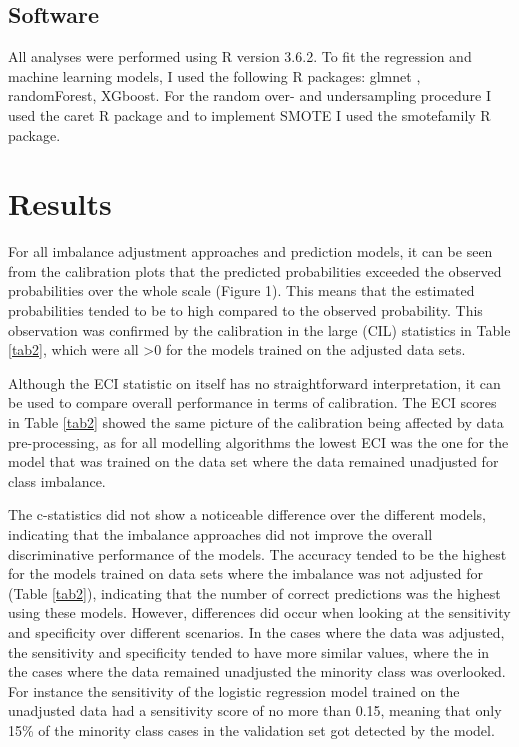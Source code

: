 \documentclass[AMA,STIX1COL, table]{WileyNJD-v2}
\begin{document}
\subsection{Software}
All analyses were performed using {\selectfont R version 3.6.2}.\cite{R} To fit the regression and machine learning models, I used the following R packages: {\selectfont
glmnet} \cite{glmnet}, 
{\selectfont randomForest}\cite{randomForest}, 
{\selectfont XGboost}\cite{xgboost}. For the random over- and undersampling procedure I used the {\selectfont caret}\cite{caret} R package and to implement SMOTE I used the {\selectfont smotefamily}\cite{smotefamily} R package.


\section{Results}
For all imbalance adjustment approaches and prediction models, it can be seen from the calibration plots that the predicted probabilities exceeded the observed probabilities over the whole scale (Figure 1). This means that the estimated probabilities tended to be to high compared to the observed probability. This observation was confirmed by the calibration in the large (CIL) statistics in Table \ref{tab2}, which were all >0 for the models trained on the adjusted data sets. 

Although the ECI statistic on itself has no straightforward interpretation, it can be used to compare overall performance in terms of calibration. The ECI scores in Table \ref{tab2} showed the same picture of the calibration being affected by data pre-processing, as for all modelling algorithms the lowest ECI was the one for the model that was trained on the data set where the data remained unadjusted for class imbalance. 

	
The c-statistics did not show a noticeable difference over the different models, indicating that the imbalance approaches did not improve the overall discriminative performance of the models. The accuracy tended to be the highest for the models trained on data sets where the imbalance was not adjusted for (Table \ref{tab2}), indicating that the number of correct predictions was the highest using these models. However, differences did occur when looking at the sensitivity and specificity over different scenarios. In the cases where the data was adjusted, the sensitivity and specificity tended to have more similar values, where the in the cases where the data remained unadjusted the minority class was overlooked. For instance the sensitivity of the logistic regression model trained on the unadjusted data had a sensitivity score of no more than 0.15, meaning that only 15\% of the minority class cases in the validation set got detected by the model. 
\end{document}
